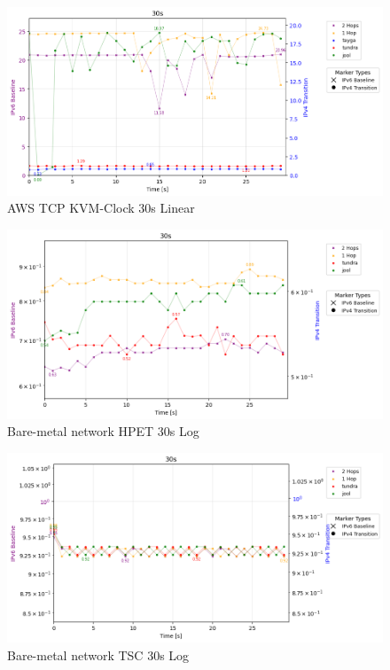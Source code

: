 \begin{figure}[H]
    \centering
    \includegraphics[width=1\textwidth]{resources/finalPlots/appendix/jitter/AWS_tcp_dualAxis_kvm-clock_30s_linear.png}
    \caption{AWS TCP KVM-Clock 30s Linear}
    \label{fig:aws_tcp_jitter_kvm_30s_linear}
\end{figure}



\begin{figure}[H]
    \centering
    \includegraphics[width=1\textwidth]{resources/finalPlots/appendix/jitter/LocalDouble_tcp_dualAxis_hpet_30s_log.png}
    \caption{Bare-metal network HPET 30s Log}
    \label{fig:local_double_tcp_jitter_hpet_30s_log}
\end{figure}



\begin{figure}[H]
    \centering
    \includegraphics[width=1\textwidth]{resources/finalPlots/appendix/jitter/LocalDouble_tcp_dualAxis_tsc_30s_log.png}
    \caption{Bare-metal network TSC 30s Log}
    \label{fig:local_double_tcp_jitter_tsc_30s_log}
\end{figure}





